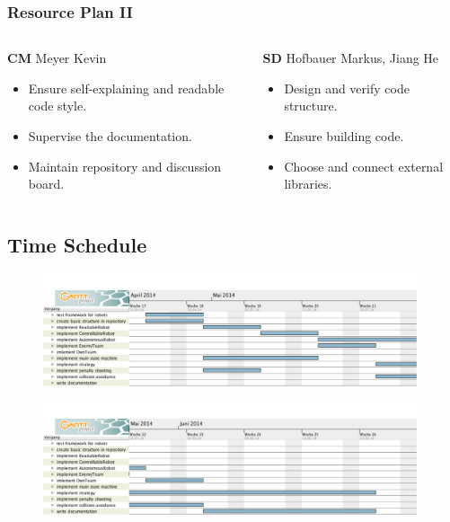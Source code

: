 \documentclass[hyperref={pdfpagelabels=false},compress]{beamer}
\begin{document}
\begin{frame}
	\frametitle{Resource Plan II}
	\begin{columns}[t]
		\begin{column}{0.50\textwidth}
			\begin{block}{\textbf{CM} Meyer Kevin}
				\begin{itemize}
					\item Ensure self-explaining and readable code style.
					\item Supervise the documentation.
					\item Maintain repository and discussion board.
				\end{itemize}
			\end{block}
		\end{column}

		\begin{column}{0.50\textwidth}
			\begin{block}{\textbf{SD} Hofbauer Markus, Jiang He}
				\begin{itemize}
					\item Design and verify code structure.
					\item Ensure building code.
					\item Choose and connect external libraries.
				\end{itemize}
			\end{block}
		\end{column}
	\end{columns}
\end{frame}

\subsection{Time Schedule}
\begin{frame}
	\begin{figure}
		\centering
		\includegraphics[width = 0.98\textwidth]{g1}
	\end{figure}
	\begin{figure}
		\centering
		\includegraphics[width = 0.98\textwidth]{g2}
	\end{figure}
\end{frame}
\end{document}
